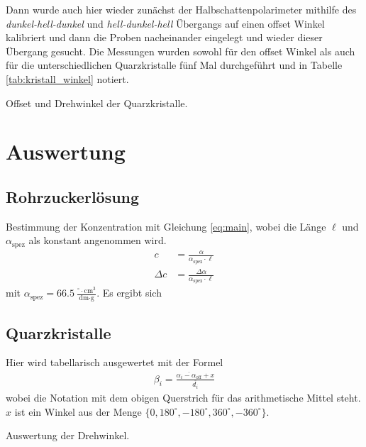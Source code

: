 \documentclass{article}
\newcommand{\as}{\alpha_\text{spez}}
\begin{document}
Dann wurde auch hier wieder zunächst der Halbschattenpolarimeter mithilfe des \textit{dunkel-hell-dunkel} und \textit{hell-dunkel-hell} Übergangs auf einen offset Winkel kalibriert und dann die Proben nacheinander eingelegt und wieder dieser Übergang gesucht. Die Messungen wurden sowohl für den offset Winkel als auch für die unterschiedlichen Quarzkristalle fünf Mal durchgeführt und in Tabelle \ref{tab:kristall_winkel} notiert.


\begin{table}[H]
\caption{Offset und Drehwinkel der Quarzkristalle.}
\label{tab:kristall_winkel}
\centering

\end{table}


\section{Auswertung}


\subsection{Rohrzuckerlösung}


Bestimmung der Konzentration mit Gleichung \eqref{eq:main}, wobei die Länge $\ell$ und $\as$ als konstant angenommen wird.
\begin{align*}
c &= \frac{\alpha}{\as\cdot \ell} \\
\Delta c &= \frac{\Delta \alpha}{\as\cdot \ell}
\end{align*}
mit $\as = 66.5~\frac{{}^\circ\cdot \text{cm}^3}{\text{dm}\cdot \text{g}}$. Es ergibt sich



\subsection{Quarzkristalle}

Hier wird tabellarisch ausgewertet mit der Formel
\begin{align*}
\beta_i = \frac{\overline{\alpha_i-\alpha_{\text{off}}} + x}{\overline{d_i}}
\end{align*}
wobei die Notation mit dem obigen Querstrich für das arithmetische Mittel steht. $x$ ist ein Winkel aus der Menge $\{0, 180^\circ, -180^\circ, 360^\circ, -360^\circ\}$.


\begin{table}[H]
\caption{Auswertung der Drehwinkel.}
\label{tab:kristall_auswertung}
\centering

\end{table}
\end{document}
